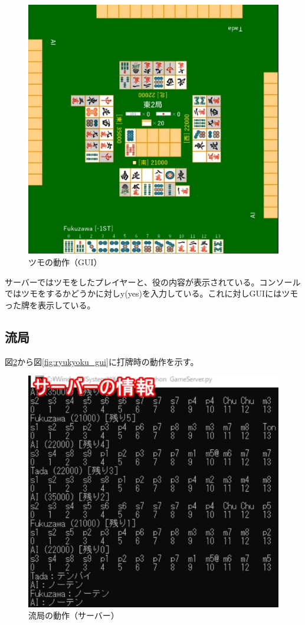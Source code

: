 \documentclass[a4j,titlepage]{jsarticle}
\begin{document}
\begin{figure}[htbp]
  \centering
  \includegraphics[width = 0.8\linewidth]{images/tsumo_gui.png}
  \caption{ツモの動作（GUI）}
  \label{fig:tsumo_gui}
\end{figure}

サーバーではツモをしたプレイヤーと、役の内容が表示されている。コンソールではツモをするかどうかに対しy(yes)を入力している。これに対しGUIにはツモった牌を表示している。

\subsection{流局}
図\ref{fig:ryukyoku_server}から図\ref{fig:ryukyoku_gui}に打牌時の動作を示す。

\begin{figure}[htbp]
  \centering
  \includegraphics[width = 0.7\linewidth]{images/ryukyoku_server.png}
  \caption{流局の動作（サーバー）}
  \label{fig:ryukyoku_server}
\end{figure}
\end{document}
